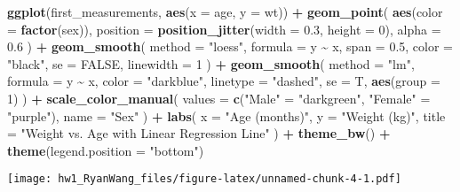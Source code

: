 \documentclass[
]{article}
\newenvironment{Shaded}{\begin{snugshade}}{\end{snugshade}}
\newcommand{\AttributeTok}[1]{\textcolor[rgb]{0.13,0.29,0.53}{#1}}
\newcommand{\ConstantTok}[1]{\textcolor[rgb]{0.56,0.35,0.01}{#1}}
\newcommand{\DecValTok}[1]{\textcolor[rgb]{0.00,0.00,0.81}{#1}}
\newcommand{\FloatTok}[1]{\textcolor[rgb]{0.00,0.00,0.81}{#1}}
\newcommand{\FunctionTok}[1]{\textcolor[rgb]{0.13,0.29,0.53}{\textbf{#1}}}
\newcommand{\NormalTok}[1]{#1}
\newcommand{\OtherTok}[1]{\textcolor[rgb]{0.56,0.35,0.01}{#1}}
\newcommand{\SpecialCharTok}[1]{\textcolor[rgb]{0.81,0.36,0.00}{\textbf{#1}}}
\newcommand{\StringTok}[1]{\textcolor[rgb]{0.31,0.60,0.02}{#1}}
\begin{document}
\begin{Shaded}
\begin{Highlighting}[]
\FunctionTok{ggplot}\NormalTok{(first\_measurements, }\FunctionTok{aes}\NormalTok{(}\AttributeTok{x =}\NormalTok{ age, }\AttributeTok{y =}\NormalTok{ wt)) }\SpecialCharTok{+}
  \FunctionTok{geom\_point}\NormalTok{(}
    \FunctionTok{aes}\NormalTok{(}\AttributeTok{color =} \FunctionTok{factor}\NormalTok{(sex)),}
    \AttributeTok{position =} \FunctionTok{position\_jitter}\NormalTok{(}\AttributeTok{width =} \FloatTok{0.3}\NormalTok{, }\AttributeTok{height =} \DecValTok{0}\NormalTok{),}
    \AttributeTok{alpha =} \FloatTok{0.6}
\NormalTok{  ) }\SpecialCharTok{+}
  \FunctionTok{geom\_smooth}\NormalTok{(}
    \AttributeTok{method =} \StringTok{"loess"}\NormalTok{,}
    \AttributeTok{formula =}\NormalTok{ y }\SpecialCharTok{\textasciitilde{}}\NormalTok{ x,}
    \AttributeTok{span =} \FloatTok{0.5}\NormalTok{,}
    \AttributeTok{color =} \StringTok{"black"}\NormalTok{,}
    \AttributeTok{se =} \ConstantTok{FALSE}\NormalTok{,}
    \AttributeTok{linewidth =} \DecValTok{1}
\NormalTok{  ) }\SpecialCharTok{+}
  \FunctionTok{geom\_smooth}\NormalTok{(}
    \AttributeTok{method =} \StringTok{"lm"}\NormalTok{,}
    \AttributeTok{formula =}\NormalTok{ y }\SpecialCharTok{\textasciitilde{}}\NormalTok{ x,}
    \AttributeTok{color =} \StringTok{"darkblue"}\NormalTok{,    }
    \AttributeTok{linetype =} \StringTok{"dashed"}\NormalTok{,}
    \AttributeTok{se =}\NormalTok{ T,         }
    \FunctionTok{aes}\NormalTok{(}\AttributeTok{group =} \DecValTok{1}\NormalTok{)  }
\NormalTok{  ) }\SpecialCharTok{+}
  \FunctionTok{scale\_color\_manual}\NormalTok{(}
    \AttributeTok{values =} \FunctionTok{c}\NormalTok{(}\StringTok{"Male"} \OtherTok{=} \StringTok{"darkgreen"}\NormalTok{, }\StringTok{"Female"} \OtherTok{=} \StringTok{"purple"}\NormalTok{),}
    \AttributeTok{name =} \StringTok{"Sex"}
\NormalTok{  ) }\SpecialCharTok{+}
  \FunctionTok{labs}\NormalTok{(}
    \AttributeTok{x =} \StringTok{"Age (months)"}\NormalTok{,}
    \AttributeTok{y =} \StringTok{"Weight (kg)"}\NormalTok{,}
    \AttributeTok{title =} \StringTok{"Weight vs. Age with Linear Regression Line"}
\NormalTok{  ) }\SpecialCharTok{+}
  \FunctionTok{theme\_bw}\NormalTok{() }\SpecialCharTok{+}
  \FunctionTok{theme}\NormalTok{(}\AttributeTok{legend.position =} \StringTok{"bottom"}\NormalTok{)}
\end{Highlighting}
\end{Shaded}

\texttt{[image: hw1\_RyanWang\_files/figure-latex/unnamed-chunk-4-1.pdf]}
\end{document}
